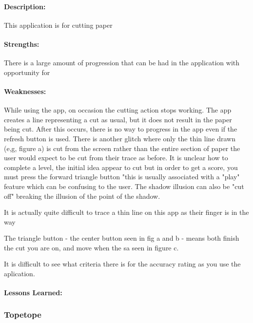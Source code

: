 \documentclass[11pt]{article}
\begin{document}
                \paragraph{Description:} This application is for cutting paper

                \paragraph{Strengths:}
                There is a large amount of progression that can be had in the application with opportunity for
                
                \paragraph{Weaknesses:}
                While using the app, on occasion the cutting action stops working. The app creates a line representing a cut as usual, but it does not result in the paper being cut. After this occurs, there is no way to progress in the app even if the refresh button is used. There is another glitch where only the thin line drawn (e,g, figure a) is cut from the screen rather than the entire section of paper the user would expect to be cut from their trace as before. 
                It is unclear how to complete a level, the initial idea appear to cut but in order to get a score, you must press the forward triangle button "this is usually associated with a "play" feature which can be confusing to the user. 
                The shadow illusion can also be "cut off" breaking the illusion of the point of the shadow. 
                
                It is actually quite difficult to trace a thin line on this app as their finger is in the way
                
                The triangle button - the center button seen in fig a and b - means both finish the cut you are on, and move when the sa seen in figure c.  
                
                It is difficult to see what criteria there is for the accuracy rating as you use the aplication. 

                
                \paragraph{Lessons Learned:}
                
                \subsubsection{Topetope}
                 
\end{document}
